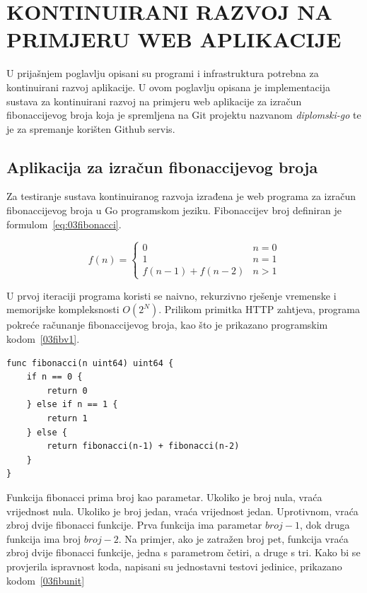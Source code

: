 \chapter{KONTINUIRANI RAZVOJ NA PRIMJERU WEB APLIKACIJE}
U prijašnjem poglavlju opisani su programi i infrastruktura potrebna za kontinuirani razvoj
aplikacije. U ovom poglavlju opisana je implementacija sustava za kontinuirani razvoj na primjeru
web aplikacije za izračun fibonaccijevog broja koja je spremljena na Git projektu nazvanom
\textit{diplomski-go} te je za spremanje korišten Github servis.

\section{Aplikacija za izračun fibonaccijevog broja}
Za testiranje sustava kontinuiranog razvoja izrađena je web programa za izračun fibonaccijevog broja
u Go programskom jeziku. Fibonaccijev broj definiran je formulom~\ref{eq:03fibonacci}.

\begin{equation}
    f(n) = \begin{cases}
               0               & n = 0\\
               1               & n = 1\\
               f(n-1) + f(n-2) & n > 1
           \end{cases}
   \label{eq:03fibonacci}
\end{equation}

U prvoj iteraciji programa koristi se naivno, rekurzivno rješenje vremenske i memorijske
kompleksnosti $O(2^N)$. Prilikom primitka HTTP zahtjeva, programa pokreće računanje fibonaccijevog
broja, kao što je prikazano programskim kodom~\ref{03fibv1}.

\begin{lstlisting}[float=h]
func fibonacci(n uint64) uint64 {
	if n == 0 {
		return 0
	} else if n == 1 {
		return 1
	} else {
		return fibonacci(n-1) + fibonacci(n-2)
	}
}
\end{lstlisting}

Funkcija fibonacci prima broj kao parametar. Ukoliko je broj nula, vraća vrijednost nula.
Ukoliko je broj jedan, vraća vrijednost jedan. Uprotivnom, vraća zbroj dvije fibonacci funkcije.
Prva funkcija ima parametar $broj-1$, dok druga funkcija ima broj $broj-2$. Na primjer, ako je
zatražen broj pet, funkcija vraća zbroj dvije fibonacci funkcije, jedna s parametrom četiri, a druge
s tri. Kako bi se provjerila ispravnost koda, napisani su jednostavni testovi jedinice, prikazano
kodom~\ref{03fibunit}

